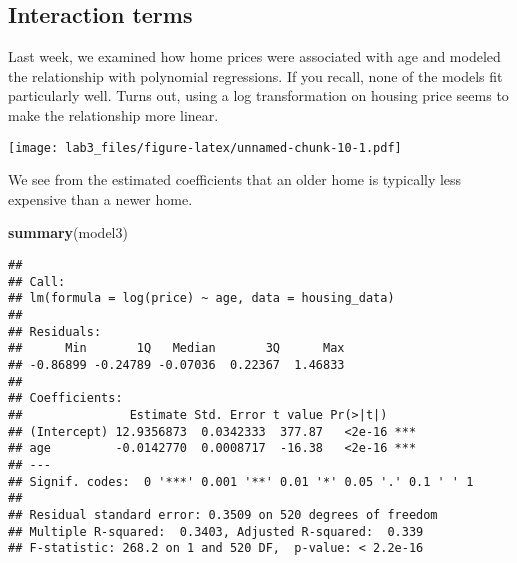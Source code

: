 \documentclass[
]{article}
\newenvironment{Shaded}{\begin{snugshade}}{\end{snugshade}}
\newcommand{\AttributeTok}[1]{\textcolor[rgb]{0.13,0.29,0.53}{#1}}
\newcommand{\DecValTok}[1]{\textcolor[rgb]{0.00,0.00,0.81}{#1}}
\newcommand{\FunctionTok}[1]{\textcolor[rgb]{0.13,0.29,0.53}{\textbf{#1}}}
\newcommand{\NormalTok}[1]{#1}
\newcommand{\OtherTok}[1]{\textcolor[rgb]{0.56,0.35,0.01}{#1}}
\newcommand{\SpecialCharTok}[1]{\textcolor[rgb]{0.81,0.36,0.00}{\textbf{#1}}}
\newcommand{\StringTok}[1]{\textcolor[rgb]{0.31,0.60,0.02}{#1}}
\begin{document}
\subsection{Interaction terms}\label{interaction-terms}

Last week, we examined how home prices were associated with age and
modeled the relationship with polynomial regressions. If you recall,
none of the models fit particularly well. Turns out, using a log
transformation on housing price seems to make the relationship more
linear.

\begin{Shaded}
\end{Shaded}

\texttt{[image: lab3\_files/figure-latex/unnamed-chunk-10-1.pdf]}

We see from the estimated coefficients that an older home is typically
less expensive than a newer home.

\begin{Shaded}
\begin{Highlighting}[]
\FunctionTok{summary}\NormalTok{(model3)}
\end{Highlighting}
\end{Shaded}

\begin{verbatim}
## 
## Call:
## lm(formula = log(price) ~ age, data = housing_data)
## 
## Residuals:
##      Min       1Q   Median       3Q      Max 
## -0.86899 -0.24789 -0.07036  0.22367  1.46833 
## 
## Coefficients:
##               Estimate Std. Error t value Pr(>|t|)    
## (Intercept) 12.9356873  0.0342333  377.87   <2e-16 ***
## age         -0.0142770  0.0008717  -16.38   <2e-16 ***
## ---
## Signif. codes:  0 '***' 0.001 '**' 0.01 '*' 0.05 '.' 0.1 ' ' 1
## 
## Residual standard error: 0.3509 on 520 degrees of freedom
## Multiple R-squared:  0.3403, Adjusted R-squared:  0.339 
## F-statistic: 268.2 on 1 and 520 DF,  p-value: < 2.2e-16
\end{verbatim}
\end{document}

